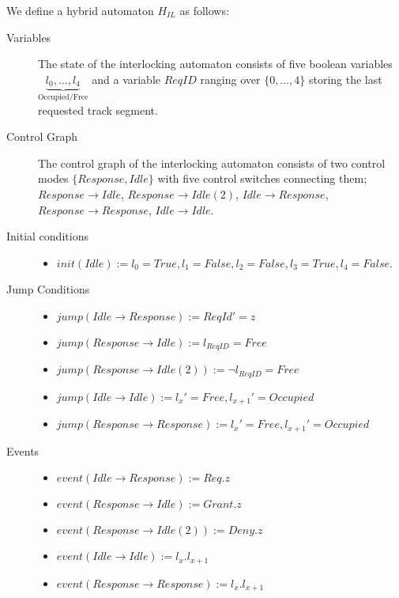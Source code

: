 \begin{mydef}
We define a hybrid automaton $H_{IL}$ as follows:
\begin{description}
\item[Variables] The state of the interlocking automaton consists of five boolean variables  $\underbrace{l_0, \ldots , l_4}_\text{Occupied/Free}$ and a variable $ReqID$ ranging over $\{0 , \ldots , 4 \}$ storing the last requested track segment.

\item[Control Graph] The control graph of the interlocking automaton consists of two control modes $\{Response, Idle \}$ with five control switches connecting them; $Response \to Idle$, $Response \to Idle (2)$, $Idle \to Response$, $Response \to Response$, $Idle \to Idle$.

\item[Initial conditions] \hspace*{0mm}
	\begin{itemize}
	\item $init(Idle) := l_0 = True, l_1 = False, l_2 = False, l_3 = True, l_4 = False$.

	\end{itemize}

\item[Jump Conditions] \hspace*{0mm}

	\begin{itemize}
	\item $jump(Idle \to Response) :=  ReqId' = z$

	
	\item $jump(Response \to Idle) :=  l_{ReqID} = Free $ 
    

         \item $jump(Response \to Idle (2)) :=  \neg l_{ReqID} = Free$


	\item $jump(Idle \to Idle) :=  l_x' = Free, l_{x+1}' = Occupied$

	\item $jump(Response \to Response) := l_x' = Free, l_{x+1}' = Occupied$


	\end{itemize}

\item[Events] \hspace*{0mm}
\begin{itemize}
	\item $event (Idle \to Response) := Req.z$
	\item $event(Response \to Idle) := Grant.z$
	\item $event(Response \to Idle (2)) := Deny.z$
	\item $event(Idle \to Idle) := l_x.l_{x+1}$
	\item $event(Response \to Response) := l_x.l_{x+1}$	
\end{itemize}

\end{description}
\end{mydef} 
